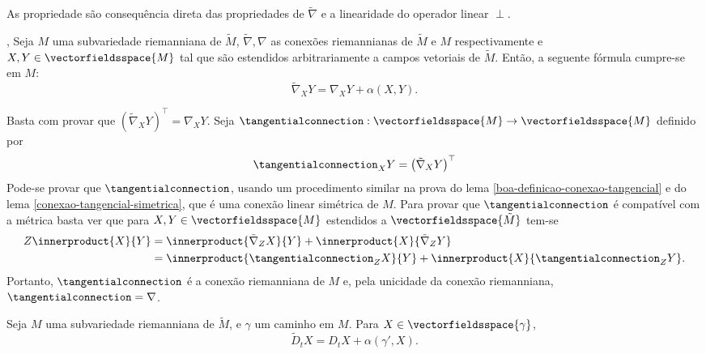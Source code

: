\begin{demonstracao}
	As propriedade são consequência direta das propriedades de $\tilde{\nabla}$ e a linearidade do operador linear $\perp$. 
\end{demonstracao}

\begin{teorema}\label{formula-de-gauss},
	Seja $M$ uma subvariedade riemanniana de $\tilde{M}$,
	$\tilde{\nabla}, \nabla$ as conexões riemannianas de $\tilde{M}$ e $M$ respectivamente e
	$X,Y \in \vectorfieldsspace{M}$ tal que são estendidos arbitrariamente a campos vetoriais de $\tilde{M}$.
	Então, a seguente fórmula cumpre-se em $M$:
	\begin{equation*}
		\tilde{\nabla}_X Y = \nabla_X Y + \alpha(X,Y).
	\end{equation*}
\end{teorema}

\begin{demonstracao}
	Basta com provar que $\left(\tilde{\nabla}_X Y\right)^\top = \nabla_X Y$. 
	Seja $\tangentialconnection: \vectorfieldsspace{M} \rightarrow \vectorfieldsspace{M}$ definido por
	\begin{equation*}
		\tangentialconnection_X Y = \left(\tilde{\nabla}_X Y\right)^\top	
	\end{equation*}
	Pode-se provar que $\tangentialconnection$, usando um procedimento similar na prova do lema \ref{boa-definicao-conexao-tangencial} e do lema \ref{conexao-tangencial-simetrica}, que é uma conexão linear simétrica de $M$. Para provar que $\tangentialconnection$ é compatível com a métrica basta ver que para $X,Y \in \vectorfieldsspace{M}$ estendidos a $\vectorfieldsspace{\tilde{M}}$ tem-se
	\begin{align*}
		Z \innerproduct{X}{Y} &= \innerproduct{\tilde{\nabla}_Z X}{Y} + \innerproduct{X}{\tilde{\nabla}_Z Y}\\
		&= \innerproduct{\tangentialconnection_Z X}{Y} + \innerproduct{X}{\tangentialconnection_Z Y}.
	\end{align*}
	Portanto, $\tangentialconnection$ é a conexão riemanniana de $M$ e, pela unicidade da conexão riemanniana, $\tangentialconnection = \nabla$.
\end{demonstracao}

\begin{proposicao}\label{formula-de-gauss-para-caminhos}
	Seja $M$ uma subvariedade riemanniana de $\tilde{M}$, e $\gamma$ um caminho em $M$. Para $X \in \vectorfieldsspace{\gamma}$,
	\begin{equation*}
	\tilde{D}_t X = D_t X + \alpha(\gamma', X).
	\end{equation*}
\end{proposicao}

